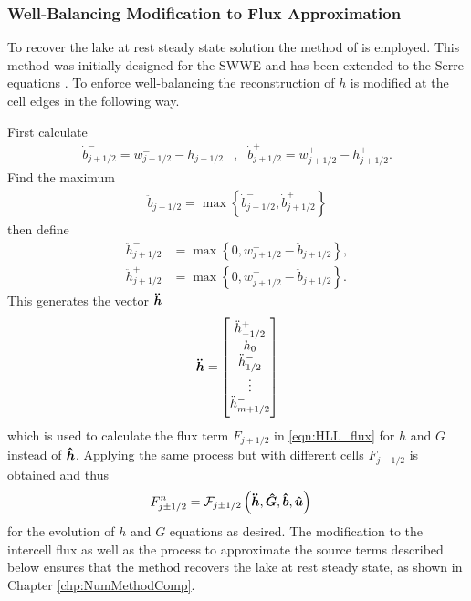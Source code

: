 \subsubsection{Well-Balancing Modification to Flux Approximation}
To recover the lake at rest steady state solution the method of \citet{Klein-etal-2004-2050} is employed. This method was initially designed for the SWWE and has been extended to the Serre equations \cite{Pitt-J-2014}. To enforce well-balancing the reconstruction of $h$ is modified at the cell edges in the following way.

First calculate
\begin{align}
\dot{b}^-_{j+1/2} = w^-_{j+1/2} - h^-_{j+1/2} &, &\dot{b}^+_{j+1/2} = w^+_{j+1/2} - h^+_{j+1/2}.
\label{eqn:BedReDefWmH}
\end{align}
Find the maximum
\begin{align*}
\ddot{b}_{j+1/2} = \max\left\lbrace\dot{b}^-_{j+1/2} , \dot{b}^+_{j+1/2} \right\rbrace
\end{align*}
then define
\begin{subequations}
\begin{align}
\ddot{h}^-_{j+1/2} &= \max\left\lbrace 0, w^-_{j+1/2} - \ddot{b}_{j+1/2}  \right\rbrace, \\  \ddot{h}^+_{j+1/2} &= \max\left\lbrace 0, w^+_{j+1/2} - \ddot{b}_{j+1/2} \right\rbrace.
\end{align}
\label{eqn:ModifiedHValue}
\end{subequations}
This generates the vector $\boldsymbol{\ddot{h}}$
\begin{equation*}
\vecn{\ddot{h}}= \begin{bmatrix} \TM
\ddot{h}^+_{-1/2} \\ h_0 \\ \ddot{h}^-_{1/2} \\ \vdots  \\ \ddot{h}^-_{m + 1/2}  \BM \end{bmatrix}
\end{equation*}
which is used to calculate the flux term $F_{j+1/2}$ in \eqref{eqn:HLL_flux} for $h$ and $G$ instead of $\boldsymbol{\hat{h}}$. Applying the same process but with different cells $F_{j-1/2}$ is obtained and thus
\begin{align*}	
F^n_{j\pm 1/2} &=\mathcal{F}_{j\pm1/2} \left(\boldsymbol{\ddot{h}}, \boldsymbol{\hat{G}},\boldsymbol{\hat{b}}, \boldsymbol{\hat{u}}  \right)
\end{align*}
for the evolution of $h$ and $G$ equations as desired. The modification to the intercell flux as well as the process to approximate the source terms described below ensures that the method recovers the lake at rest steady state, as shown in Chapter \ref{chp:NumMethodComp}.

